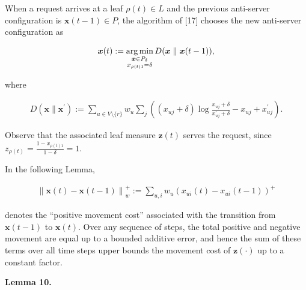 When a request arrives at a leaf $\rho(t)\in L$ and the previous anti-server configuration is ${\boldsymbol{x}}(t-1)\in P$, the algorithm of [17] chooses the new anti-server configuration as\par


\[\begin{gathered}
\displaystyle{\boldsymbol{x}}(t):=\operatorname*{arg\,min}_{\begin{subarray}{c}{\boldsymbol{x}}\in P_{\delta}\\
x_{\rho(t)1}=\delta\end{subarray}}D({\boldsymbol{x}}\parallel{\boldsymbol{x}}(t-1)),
\end{gathered}\]


where\par


\[\begin{gathered}
\displaystyle D({\boldsymbol{x}}\parallel{\boldsymbol{x}}^{\prime}):=\sum_{u\in V\setminus\{r\}}w_{u}\sum_{j}\left((x_{uj}+\delta)\log\frac{x_{uj}+\delta}{x^{\prime}_{uj}+\delta}-x_{uj}+x^{\prime}_{uj}\right).
\end{gathered}\]


Observe that the associated leaf measure ${\mathbf{z}}(t)$ serves the request, since $z_{\rho(t)}=\frac{1-x_{\rho(t)1}}{1-\delta}=1$.\par




In the following Lemma,\par


\[\begin{gathered}
\displaystyle\left\|{\boldsymbol{x}}(t)-{\boldsymbol{x}}(t-1)\right\|_{w}^{+}:=\sum_{u,i}w_{u}\left(x_{ui}(t)-x_{ui}(t-1)\right)^{+}
\end{gathered}\]


denotes the “positive movement cost” associated with the transition from ${\boldsymbol{x}}(t-1)$ to ${\boldsymbol{x}}(t)$. Over any sequence of steps, the total positive and negative movement are equal up to a bounded additive error, and hence the sum of these terms over all time steps upper bounds the movement cost of ${\mathbf{z}}(\cdot)$ up to a constant factor.\par





\par\medskip\noindent\textbf{
\textbf{Lemma 10}\textbf{.}
}\par



